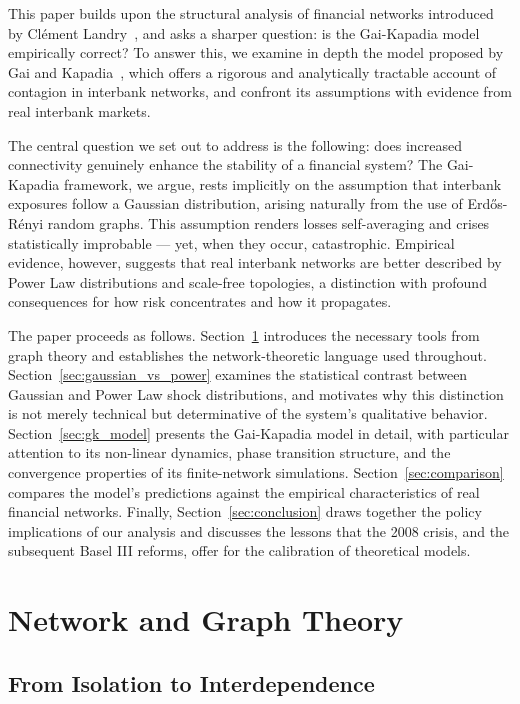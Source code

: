 \documentclass[a4paper,12pt,twoside]{article}
\begin{document}
This paper builds upon the structural analysis of financial networks 
introduced by Clément Landry~\cite{landry2025}, and asks a sharper 
question: is the Gai-Kapadia model empirically correct? To answer 
this, we examine in depth the model proposed by Gai and 
Kapadia~\cite{gai2010}, which offers a rigorous and analytically 
tractable account of contagion in interbank networks, and confront its 
assumptions with evidence from real interbank markets.

The central question we set out to address is the following: does 
increased connectivity genuinely enhance the stability of a financial 
system? The Gai-Kapadia framework, we argue, rests implicitly on the 
assumption that interbank exposures follow a Gaussian distribution, 
arising naturally from the use of Erdős-Rényi random graphs. This 
assumption renders losses self-averaging and crises statistically 
improbable --- yet, when they occur, catastrophic. Empirical evidence, 
however, suggests that real interbank networks are better described by 
Power Law distributions and scale-free topologies, a distinction with 
profound consequences for how risk concentrates and how it propagates.

The paper proceeds as follows. Section~\ref{sec:network} introduces 
the necessary tools from graph theory and establishes the 
network-theoretic language used throughout. 
Section~\ref{sec:gaussian_vs_power} examines the statistical contrast 
between Gaussian and Power Law shock distributions, and motivates why 
this distinction is not merely technical but determinative of the 
system's qualitative behavior. Section~\ref{sec:gk_model} presents the 
Gai-Kapadia model in detail, with particular attention to its 
non-linear dynamics, phase transition structure, and the convergence 
properties of its finite-network simulations. 
Section~\ref{sec:comparison} compares the model's predictions against 
the empirical characteristics of real financial networks. Finally, 
Section~\ref{sec:conclusion} draws together the policy implications of 
our analysis and discusses the lessons that the 2008 crisis, and the 
subsequent Basel III reforms, offer for the calibration of theoretical 
models.
\newpage
\section{Network and Graph Theory}
\label{sec:network}
\subsection{From Isolation to Interdependence}
\end{document}
